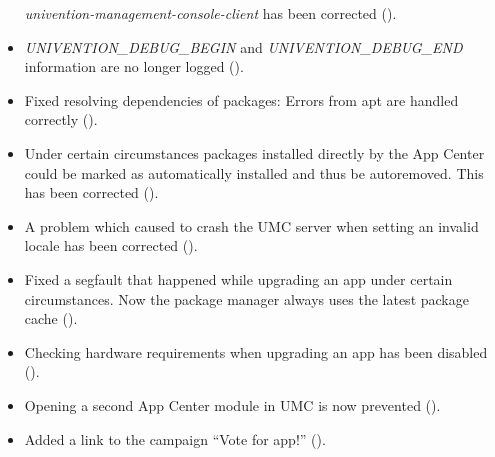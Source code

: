 \begin{itemize}
  \emph{univention-management-console-client} has been corrected
  ().
\item \emph{UNIVENTION\_DEBUG\_BEGIN} and \emph{UNIVENTION\_DEBUG\_END}
  information are no longer logged ().
\item Fixed resolving dependencies of packages: Errors from apt are handled
  correctly ().
\item Under certain circumstances packages installed directly by the App Center
  could be marked as automatically installed and thus be autoremoved. This has
  been corrected ().
\item A problem which caused to crash the UMC server when setting an
  invalid locale has been corrected ().
\item Fixed a segfault that happened while upgrading an app under certain
  circumstances. Now the package manager always uses the latest package cache
  ().
\item Checking hardware requirements when upgrading an app has been disabled
  ().
\item Opening a second App Center module in UMC is now prevented
  ().
\item Added a link to the campaign ``Vote for app!'' ().
\end{itemize}

